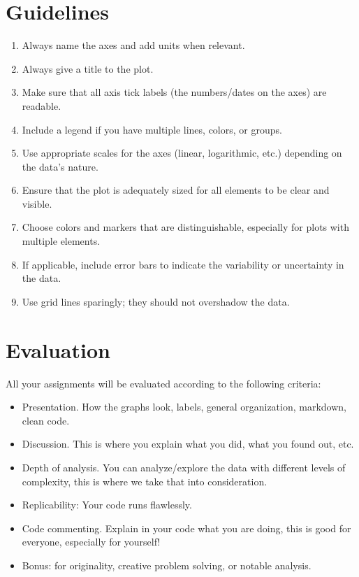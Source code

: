 \documentclass[
  letterpaper,
  DIV=11,
  numbers=noendperiod,
  oneside]{scrreprt}
\providecommand{\tightlist}{%
  \setlength{\itemsep}{0pt}\setlength{\parskip}{0pt}}\usepackage{longtable,booktabs,array}
\begin{document}
\hypertarget{guidelines}{%
\section{Guidelines}\label{guidelines}}

\begin{enumerate}
\def\labelenumi{\arabic{enumi}.}
\tightlist
\item
  Always name the axes and add units when relevant.
\item
  Always give a title to the plot.
\item
  Make sure that all axis tick labels (the numbers/dates on the axes)
  are readable.
\item
  Include a legend if you have multiple lines, colors, or groups.
\item
  Use appropriate scales for the axes (linear, logarithmic, etc.)
  depending on the data's nature.
\item
  Ensure that the plot is adequately sized for all elements to be clear
  and visible.
\item
  Choose colors and markers that are distinguishable, especially for
  plots with multiple elements.
\item
  If applicable, include error bars to indicate the variability or
  uncertainty in the data.
\item
  Use grid lines sparingly; they should not overshadow the data.
\end{enumerate}

\hypertarget{evaluation}{%
\section{Evaluation}\label{evaluation}}

All your assignments will be evaluated according to the following
criteria:

\begin{itemize}
\tightlist
\item
  Presentation. How the graphs look, labels, general organization,
  markdown, clean code.
\item
  Discussion. This is where you explain what you did, what you found
  out, etc.
\item
  Depth of analysis. You can analyze/explore the data with different
  levels of complexity, this is where we take that into consideration.
\item
  Replicability: Your code runs flawlessly.
\item
  Code commenting. Explain in your code what you are doing, this is good
  for everyone, especially for yourself!
\item
  Bonus: for originality, creative problem solving, or notable analysis.
\end{itemize}
\end{document}

